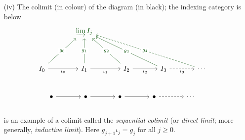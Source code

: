 \begin{example}
\begin{itemize}
\item[(iv)] The colimit (in colour) of the diagram (in black); the indexing category is below %
\[\begin{tikzcd}[row sep=huge, column sep=large]
                                                        & {\color{darkgreen}\varinjlim I_j}                                         &                                                         &                                                                  &                                                \\
I_0 \arrow[r, "\iota_0"'] \arrow[ru, "g_0" description,darkgreen] & I_1 \arrow[r, "\iota_1"'] \arrow[u, "g_1" description,darkgreen] & I_2 \arrow[r, "\iota_2"'] \arrow[lu, "g_2" description,darkgreen] & I_3 \arrow[r, "\iota_3"', dashed] \arrow[llu, "g_3" description,darkgreen] & \cdots \arrow[lllu, "g_4" description, dashed,darkgreen]
\end{tikzcd}\]\\[-0.6em]
\[\begin{tikzcd}[row sep=huge, column sep=large]
\bullet \arrow[r] & \bullet \arrow[r] & \bullet \arrow[r] & \bullet \arrow[r, dashed] & \cdots
\end{tikzcd}\]\\[-0.6em]
is an example of a colimit called the \emph{sequential colimit} (or \emph{direct limit}; more generally, \emph{inductive limit}). Here $g_{j+1}\iota_j = g_j$ for all $j \geq 0$.
\end{itemize}
\end{example}


